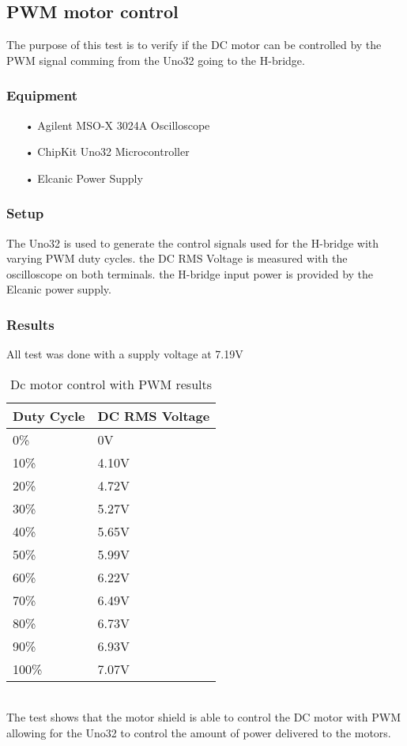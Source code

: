 \subsection{PWM motor control}
The purpose of this test is to verify if the DC motor can be controlled by the PWM signal comming from the Uno32 going to the H-bridge.
 
\subsubsection{Equipment}
\begin{enumerate}
	\item[•]Agilent MSO-X 3024A Oscilloscope
	\item[•]ChipKit Uno32 Microcontroller
	\item[•]Elcanic Power Supply
\end{enumerate}
 
\subsubsection{Setup}
The Uno32 is used to generate the control signals used for the H-bridge with varying PWM duty cycles. the DC RMS Voltage is measured with the oscilloscope on both terminals.
the H-bridge input power is provided by the Elcanic power supply.
 
\subsubsection{Results}
All test was done with a supply voltage at 7.19V
\begin{table}[h]
\centering
\begin{tabular}{|l|l|}
\hline
\textbf{Duty Cycle} & \textbf{DC RMS Voltage} \\ \hline
0\%                 & 0V                      \\ \hline
10\%                & 4.10V                   \\ \hline
20\%                & 4.72V                   \\ \hline
30\%                & 5.27V                   \\ \hline
40\%                & 5.65V                   \\ \hline
50\%                & 5.99V                   \\ \hline
60\%                & 6.22V                   \\ \hline
70\%                & 6.49V                   \\ \hline
80\%                & 6.73V                   \\ \hline
90\%                & 6.93V                   \\ \hline
100\%               & 7.07V                   \\ \hline
\end{tabular}
\caption{Dc motor control with PWM results}
\label{dcpwmresults}
\end{table}\\
The test shows that the motor shield is able to control the DC motor with PWM allowing for the Uno32 to control the amount of power delivered to the motors.